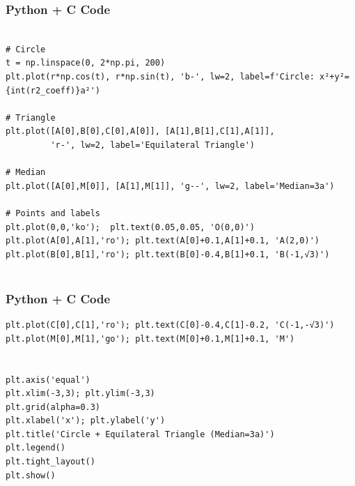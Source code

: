 \documentclass{beamer}
\numberwithin{equation}{section}
\begin{document}
\begin{frame}[fragile]
    \frametitle{Python + C Code }
    \begin{lstlisting}
    
# Circle
t = np.linspace(0, 2*np.pi, 200)
plt.plot(r*np.cos(t), r*np.sin(t), 'b-', lw=2, label=f'Circle: x²+y²={int(r2_coeff)}a²')

# Triangle
plt.plot([A[0],B[0],C[0],A[0]], [A[1],B[1],C[1],A[1]],
         'r-', lw=2, label='Equilateral Triangle')

# Median
plt.plot([A[0],M[0]], [A[1],M[1]], 'g--', lw=2, label='Median=3a')

# Points and labels
plt.plot(0,0,'ko');  plt.text(0.05,0.05, 'O(0,0)')
plt.plot(A[0],A[1],'ro'); plt.text(A[0]+0.1,A[1]+0.1, 'A(2,0)')
plt.plot(B[0],B[1],'ro'); plt.text(B[0]-0.4,B[1]+0.1, 'B(-1,√3)')


\end{lstlisting}
\end{frame}
\begin{frame}[fragile]
    \frametitle{Python + C Code }
    \begin{lstlisting}
plt.plot(C[0],C[1],'ro'); plt.text(C[0]-0.4,C[1]-0.2, 'C(-1,-√3)')
plt.plot(M[0],M[1],'go'); plt.text(M[0]+0.1,M[1]+0.1, 'M')


plt.axis('equal')
plt.xlim(-3,3); plt.ylim(-3,3)
plt.grid(alpha=0.3)
plt.xlabel('x'); plt.ylabel('y')
plt.title('Circle + Equilateral Triangle (Median=3a)')
plt.legend()
plt.tight_layout()
plt.show()


\end{lstlisting}
\end{frame}
\end{document}
